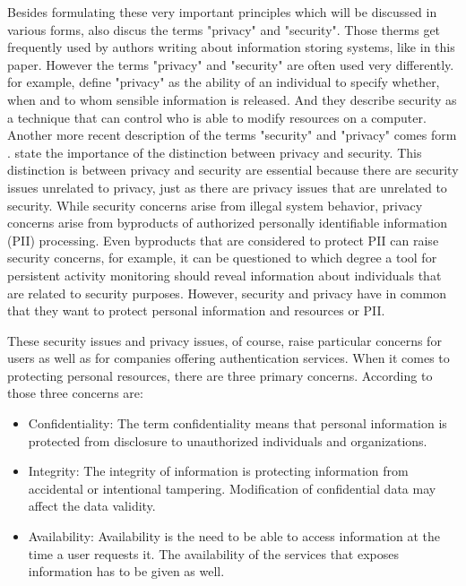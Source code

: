 Besides formulating these very important principles which will be discussed in various forms, \cite{Saltzer:PICS} also discus the terms "privacy" and "security". Those therms get frequently used by authors writing about information storing systems, like in this paper. However the terms "privacy" and "security" are often used very differently. \cite{Saltzer:PICS} for example, define "privacy" as the ability of an individual to specify whether, when and to whom sensible information is released. And they describe security as a technique that can control who is able to modify resources on a computer. Another more recent description of the terms "security" and "privacy" comes form \cite{Brooks:2017:IPE}. \cite{Brooks:2017:IPE} state the importance of the distinction between privacy and security. This distinction is between privacy and security are essential because there are security issues unrelated to privacy, just as there are privacy issues that are unrelated to security. While security concerns arise from illegal system behavior, privacy concerns arise from byproducts of authorized personally identifiable information (PII) processing. Even byproducts that are considered to protect PII can raise security concerns, for example, it can be questioned to which degree a tool for persistent activity monitoring should reveal information about individuals that are related to security purposes. However, security and privacy have in common that they want to protect personal information and resources or PII.

These security issues and privacy issues, of course, raise particular concerns for users as well as for companies offering authentication services. When it comes to protecting personal resources, there are three primary concerns. According to \cite{Todorov:2007:MUI} those three concerns are:  

\begin{itemize}
	\item Confidentiality: The term confidentiality means that personal information is protected from 
	disclosure to unauthorized individuals and organizations.
	\item Integrity: The integrity of information is protecting information from accidental or intentional
	tampering. Modification of confidential data may affect the data validity. 
	\item Availability: Availability is the need to be able to access information at the time a user requests it. 
The availability of the services that exposes information has to be given as well. 
\end{itemize}

